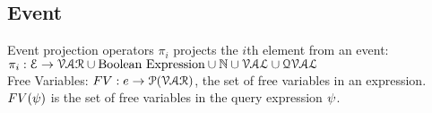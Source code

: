 %
%
\subsection{Event}
%
Event projection operators $\pi_i$ projects the $i$th element from an event: 
\\
$\pi_i : 
\mathcal{E} \to \mathcal{VAR}\cup \mbox{Boolean Expression}  \cup \mathbb{N} \cup \mathcal{VAL} \cup \mathcal{QVAL} $ 
\\
%
%
Free Variables: $FV: e \to \mathcal{P}(\mathcal{VAR})$, the set of free variables in an expression.
\\
$FV(\psi)$ is the set of free variables in the query expression $\psi$.

